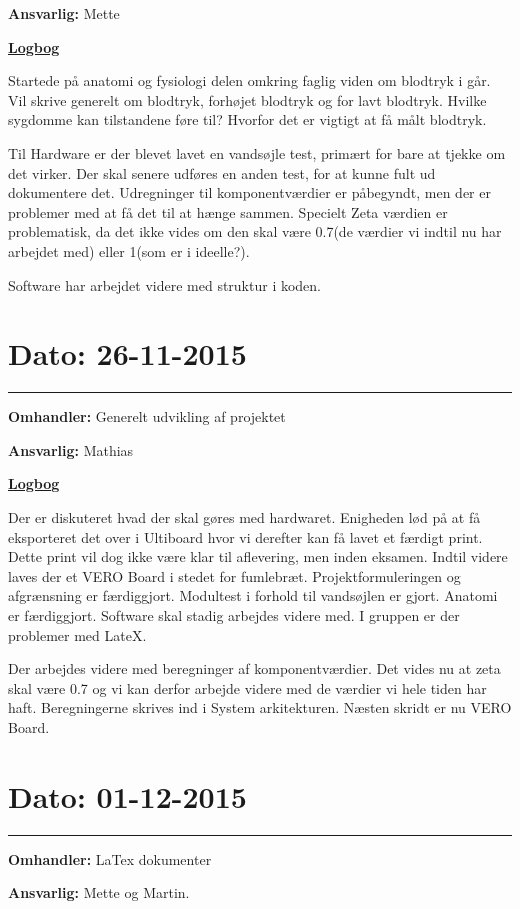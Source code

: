 \textbf{Ansvarlig:} Mette

\underline{\textbf{Logbog}}

Startede på anatomi og fysiologi delen omkring faglig viden om blodtryk i går. Vil skrive generelt om blodtryk, forhøjet blodtryk og for lavt blodtryk. Hvilke sygdomme kan tilstandene føre til? Hvorfor det er vigtigt at få målt blodtryk. 

Til Hardware er der blevet lavet en vandsøjle test, primært for bare at tjekke om det virker. Der skal senere udføres en anden test, for at kunne fult ud dokumentere det. 
Udregninger til komponentværdier er påbegyndt, men der er problemer med at få det til at hænge sammen. Specielt Zeta værdien er problematisk, da det ikke vides om den skal være 0.7(de værdier vi indtil nu har arbejdet med) eller 1(som er i ideelle?). 

Software har arbejdet videre med struktur i koden.  
\\
\section{Dato: 26-11-2015}
\hrule
\textbf{Omhandler:} Generelt udvikling af projektet

\textbf{Ansvarlig:} Mathias

\underline{\textbf{Logbog}}

Der er diskuteret hvad der skal gøres med hardwaret. Enigheden lød på at få eksporteret det over i Ultiboard hvor vi derefter kan få lavet et færdigt print. Dette print vil dog ikke være klar til aflevering, men inden eksamen. Indtil videre laves der et VERO Board i stedet for fumlebræt.
Projektformuleringen og afgrænsning er færdiggjort. Modultest i forhold til vandsøjlen er gjort. Anatomi er færdiggjort. Software skal stadig arbejdes videre med. I gruppen er der problemer med LateX.

Der arbejdes videre med beregninger af komponentværdier. Det vides nu at zeta skal være 0.7 og vi kan derfor arbejde videre med de værdier vi hele tiden har haft. Beregningerne skrives ind i System arkitekturen. Næsten skridt er nu VERO Board.  
\\

\section{Dato: 01-12-2015}
\hrule
\textbf{Omhandler:} LaTex dokumenter

\textbf{Ansvarlig:} Mette og Martin. 

